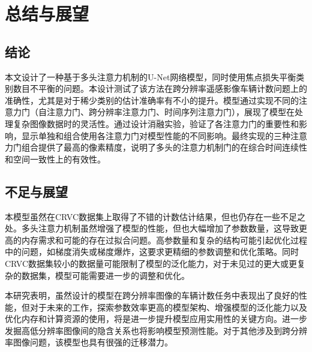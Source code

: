 
\chapter{总结与展望}
\section{结论}
本文设计了一种基于多头注意力机制的U-Net网络模型，同时使用焦点损失平衡类别数目不平衡的问题。本设计测试了该方法在跨分辨率遥感影像车辆计数问题上的准确性，尤其是对于稀少类别的估计准确率有不小的提升。模型通过实现不同的注意力门（自注意力门、跨分辨率注意力门、时间序列注意力门），展现了模型在处理复杂图像数据时的灵活性。通过设计消融实验，验证了各注意力门的重要性和影响，显示单独和组合使用各注意力门对模型性能的不同影响。最终实现的三种注意力门组合提供了最高的像素精度，说明了多头的注意力机制门的在综合时间连续性和空间一致性上的有效性。
\section{不足与展望}

本模型虽然在CRVC数据集上取得了不错的计数估计结果，但也仍存在一些不足之处。多头注意力机制虽然增强了模型的性能，但也大幅增加了参数数量，这导致更高的内存需求和可能的存在过拟合问题。高参数量和复杂的结构可能引起优化过程中的问题，如梯度消失或梯度爆炸，这要求更精细的参数调整和优化策略。同时CRVC数据集较小的数据量可能限制了模型的泛化能力，对于未见过的更大或更复杂的数据集，模型可能需要进一步的调整和优化。

本研究表明，虽然设计的模型在跨分辨率图像的车辆计数任务中表现出了良好的性能，但对于未来的工作，探索参数效率更高的模型架构、增强模型的泛化能力以及优化内存和计算资源的使用，将是进一步提升模型应用实用性的关键方向。进一步发掘高低分辨率图像间的隐含关系也将影响模型预测性能。对于其他涉及到跨分辨率图像问题，该模型也具有很强的迁移潜力。

